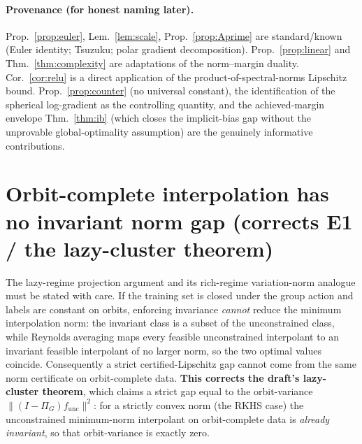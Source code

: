 \documentclass[11pt]{article}
\theoremstyle{definition}
\begin{document}
\paragraph{Provenance (for honest naming later).} Prop.~\ref{prop:euler},
Lem.~\ref{lem:scale}, Prop.~\ref{prop:Aprime} are standard/known (Euler identity;
Tsuzuku; polar gradient decomposition). Prop.~\ref{prop:linear} and
Thm.~\ref{thm:complexity} are adaptations of the norm--margin duality.
Cor.~\ref{cor:relu} is a direct application of the product-of-spectral-norms
Lipschitz bound. Prop.~\ref{prop:counter} (no universal constant), the
identification of the spherical log-gradient as the controlling quantity, and the
achieved-margin envelope Thm.~\ref{thm:ib} (which closes the implicit-bias gap without
the unprovable global-optimality assumption) are the genuinely informative
contributions.

\section{Orbit-complete interpolation has no invariant norm gap (corrects E1 / the lazy-cluster theorem)}
\label{sec:no-gap}
The lazy-regime projection argument and its rich-regime variation-norm analogue must be stated
with care. If the training set is closed under the group action and labels are constant on orbits,
enforcing invariance \emph{cannot} reduce the minimum interpolation norm: the invariant class is a
subset of the unconstrained class, while Reynolds averaging maps every feasible unconstrained
interpolant to an invariant feasible interpolant of no larger norm, so the two optimal values
coincide. Consequently a strict certified-Lipschitz gap cannot come from the same norm certificate
on orbit-complete data. \textbf{This corrects the draft's lazy-cluster theorem}, which claims a
strict gap equal to the orbit-variance $\|(I-\Pi_G)f_{\mathrm{unc}}\|^2$: for a strictly convex
norm (the RKHS case) the unconstrained minimum-norm interpolant on orbit-complete data is
\emph{already invariant}, so that orbit-variance is exactly zero.
\end{document}
